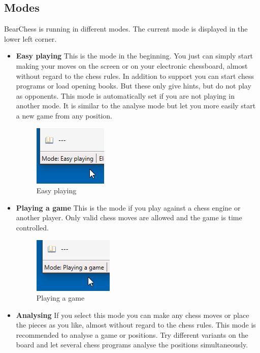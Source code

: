 \documentclass[11pt,a4paper]{article}
\begin{document}
\subsection{Modes}
BearChess is running in different modes. The current mode is displayed in the lower left corner.
\begin{itemize}
	
	\item \textbf{Easy playing} This is the mode in the beginning. You just can simply start making your moves on the screen or on your electronic chessboard, almost without regard to the chess rules. In addition to support you can start chess programs or load opening books. But these only give hints, but do not play as opponents. This mode is automatically set if you are not playing in another mode. It is similar to the analyse mode but let you more easily start a new game from any position.
	\begin{figure}[H]
		\centering
		\includegraphics[scale=1.0]{ModeEasyPlaying.png}
		\caption{Easy playing}
		\label{fig:ModeEasyPlaying}
	\end{figure}
	\item \textbf{Playing a game} This is the mode if you play against a chess engine or another player. Only valid chess moves are allowed and the game is time controlled.
	\begin{figure}[H]
		\centering
		\includegraphics[scale=1.0]{ModePlayingAGame.png}
		\caption{Playing a game}
		\label{fig:ModePlayingAGame}
	\end{figure}
	\item \textbf{Analysing} If you select this mode you can make any chess moves or place the pieces as you like, almost without regard to the chess rules. This mode is recommended to analyse a game or positions. Try different variants on the board and let several chess programs analyse the positions simultaneously. 
	\begin{figure}[H]

\end{figure}
\end{itemize}
\end{document}
